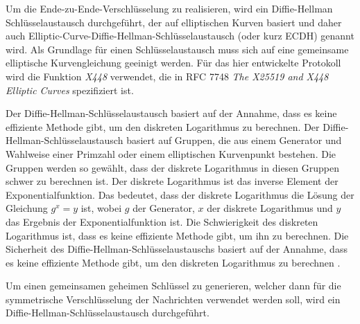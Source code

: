 Um die Ende-zu-Ende-Verschlüsselung zu realisieren, wird ein Diffie-Hellman Schlüsselaustausch durchgeführt, der auf elliptischen Kurven basiert und daher auch Elliptic-Curve-Diffie-Hellman-Schlüsselaustausch (oder kurz ECDH) genannt wird. Als Grundlage für einen Schlüsselaustausch muss sich auf eine gemeinsame elliptische Kurvengleichung geeinigt werden\Parencite[S. 118]{Wong_KryptoPraxis}. Für das hier entwickelte Protokoll wird die Funktion \textit{X448} verwendet, die in RFC 7748 \textit{The X25519 and X448 Elliptic Curves} \parencite{rfc_ellipticCurves} spezifiziert ist.

Der Diffie-Hellman-Schlüsselaustausch basiert auf der Annahme, dass es keine effiziente Methode gibt, um den diskreten Logarithmus zu berechnen. Der Diffie-Hellman-Schlüsselaustausch basiert auf Gruppen, die aus einem Generator und Wahlweise einer Primzahl oder einem elliptischen Kurvenpunkt bestehen. Die Gruppen werden so gewählt, dass der diskrete Logarithmus in diesen Gruppen schwer zu berechnen ist. Der diskrete Logarithmus ist das inverse Element der Exponentialfunktion. Das bedeutet, dass der diskrete Logarithmus die Lösung der Gleichung $g^x = y$ ist, wobei $g$ der Generator, $x$ der diskrete Logarithmus und $y$ das Ergebnis der Exponentialfunktion ist. Die Schwierigkeit des diskreten Logarithmus ist, dass es keine effiziente Methode gibt, um ihn zu berechnen. Die Sicherheit des Diffie-Hellman-Schlüsselaustauschs basiert auf der Annahme, dass es keine effiziente Methode gibt, um den diskreten Logarithmus zu berechnen \Parencite[S. 105-121]{Wong_KryptoPraxis}.

Um einen gemeinsamen geheimen Schlüssel zu generieren, welcher dann für die symmetrische Verschlüsselung der Nachrichten verwendet werden soll, wird ein Diffie-Hellman-Schlüsselaustausch durchgeführt.


